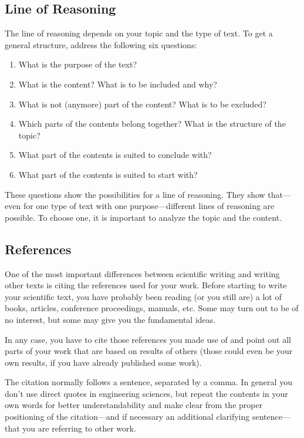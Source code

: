 \subsection{Line of Reasoning}

The line of reasoning depends on your topic and the type of text. To get a general structure, address the following six questions:

\begin{enumerate}
    \item What is the purpose of the text?
    \item What is the content? What is to be included and why?
    \item What is not (anymore) part of the content? What is to be excluded?
    \item Which parts of the contents belong together? What is the structure of the topic?
    \item What part of the contents is suited to conclude with?
    \item What part of the contents is suited to start with?
\end{enumerate}

These questions show the possibilities for a line of reasoning. They show that---even for one type of text with one purpose---different lines of reasoning are possible. 
To choose one, it is important to analyze the topic and the content.


\subsection{References}

One of the most important differences between scientific writing and writing other texts is citing the references used for your work. 
Before starting to write your scientific text, you have probably been reading (or you still are) a lot of books, articles, conference proceedings, 
manuals, etc. Some may turn out to be of no interest, but some may give you the fundamental ideas. 

In any case, you have to cite those references you made use of and point out all parts of your work that are based on results of others 
(those could even be your own results, if you have already published some work).

The citation normally follows a sentence, separated by a comma. In general you don't use direct quotes in engineering sciences, but repeat the contents in your own words for better understandability
and make clear from the proper positioning of the citation---and if necessary an additional clarifying sentence---that you are referring to other work.

